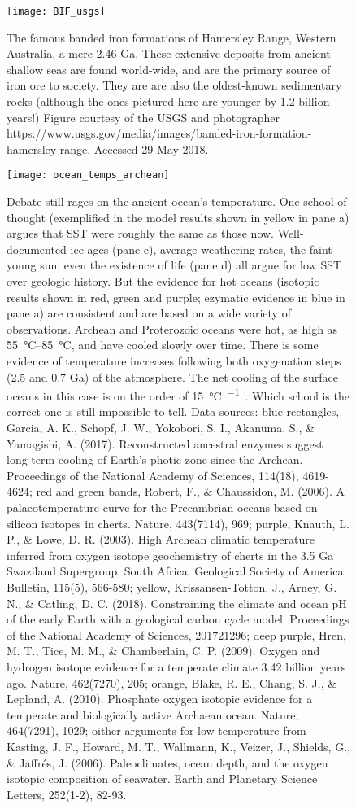 {\newpage
\begin{figure}[ht]
\centering
\texttt{[image: BIF\_usgs]}%
\caption{The famous banded iron formations of Hamersley Range, Western Australia, a mere 2.46 Ga. These extensive deposits from ancient shallow seas are found world-wide, and are the primary source of iron ore to society. They are are also the oldest-known sedimentary rocks (although the ones pictured here are younger by 1.2 billion years!) Figure courtesy of the USGS and photographer https://www.usgs.gov/media/images/banded-iron-formation-hamersley-range. Accessed 29 May 2018.}   
\label{fig:bif}
\end{figure}


\newpage
\begin{figure}[ht]
\centering
\texttt{[image: ocean\_temps\_archean]}%
\caption{Debate still rages on the ancient ocean's temperature. One school of thought (exemplified in the model results shown in yellow in pane a) argues that SST were roughly the same as those now. Well-documented ice ages (pane c), average weathering rates, the faint-young sun, even the existence of life (pane d) all argue for low SST over geologic history. But the evidence for hot oceans (isotopic results shown in red, green and purple; ezymatic evidence in blue in pane a) are consistent and are based on a wide variety of observations. Archean and Proterozoic oceans were hot, as high as \SIrange{55}{85}{\celsius}, and have cooled slowly over time. There is some evidence of temperature increases following both oxygenation steps (2.5 and 0.7 Ga) of the atmosphere. The net cooling of the surface oceans in this case is on the order of \SI[per-mode=symbol]{15}{\celsius\per\giga\year}. Which school is the correct one is still impossible to tell. Data sources: blue rectangles, Garcia, A. K., Schopf, J. W., Yokobori, S. I., Akanuma, S., \& Yamagishi, A. (2017). Reconstructed ancestral enzymes suggest long-term cooling of Earth's photic zone since the Archean. Proceedings of the National Academy of Sciences, 114(18), 4619-4624; red and green bands, Robert, F., \& Chaussidon, M. (2006). A palaeotemperature curve for the Precambrian oceans based on silicon isotopes in cherts. Nature, 443(7114), 969; purple, Knauth, L. P., \& Lowe, D. R. (2003). High Archean climatic temperature inferred from oxygen isotope geochemistry of cherts in the 3.5 Ga Swaziland Supergroup, South Africa. Geological Society of America Bulletin, 115(5), 566-580; yellow, Krissansen-Totton, J., Arney, G. N., \& Catling, D. C. (2018). Constraining the climate and ocean pH of the early Earth with a geological carbon cycle model. Proceedings of the National Academy of Sciences, 201721296; deep purple, Hren, M. T., Tice, M. M., \& Chamberlain, C. P. (2009). Oxygen and hydrogen isotope evidence for a temperate climate 3.42 billion years ago. Nature, 462(7270), 205; orange, Blake, R. E., Chang, S. J., \& Lepland, A. (2010). Phosphate oxygen isotopic evidence for a temperate and biologically active Archaean ocean. Nature, 464(7291), 1029; oither arguments for low temperature from Kasting, J. F., Howard, M. T., Wallmann, K., Veizer, J., Shields, G., \& Jaffr\'es, J. (2006). Paleoclimates, ocean depth, and the oxygen isotopic composition of seawater. Earth and Planetary Science Letters, 252(1-2), 82-93.}   

\end{figure}}
